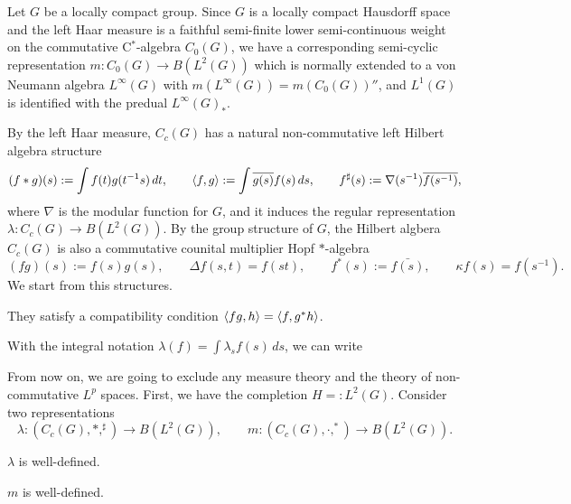 \documentclass{../../large}
\begin{document}
\begin{prb}
Let $G$ be a locally compact group.
Since $G$ is a locally compact Hausdorff space and the left Haar measure is a faithful semi-finite lower semi-continuous weight on the commutative C$^*$-algebra $C_0(G)$, we have a corresponding semi-cyclic representation $m:C_0(G)\to B(L^2(G))$ which is normally extended to a von Neumann algebra $L^\infty(G)$ with $m(L^\infty(G))=m(C_0(G))''$, and $L^1(G)$ is identified with the predual $L^\infty(G)_*$.

By the left Haar measure, $C_c(G)$ has a natural non-commutative left Hilbert algebra structure
\[(f*g)(s):=\int f(t)g(t^{-1}s)\,dt,\qquad\langle f,g\rangle:=\int\overline{g(s)}f(s)\,ds,\qquad f^\sharp(s):=\nabla(s^{-1})\overline{f(s^{-1})},\]
where $\nabla$ is the modular function for $G$, and it induces the regular representation $\lambda:C_c(G)\to B(L^2(G))$.
By the group structure of $G$, the Hilbert algbera $C_c(G)$ is also a commutative counital multiplier Hopf $*$-algebra 
\[(fg)(s):=f(s)g(s),\qquad\Delta f(s,t)=f(st),\qquad f^*(s):=\bar{f(s)},\qquad\kappa f(s)=f(s^{-1}).\]
We start from this structures.


They satisfy a compatibility condition $\langle fg,h\rangle=\langle f,g^*h\rangle$.

With the integral notation $\lambda(f)=\int\lambda_sf(s)\,ds$, we can write

From now on, we are going to exclude any measure theory and the theory of non-commutative $L^p$ spaces.
First, we have the completion $H=:L^2(G)$.
Consider two representations
\[\lambda:(C_c(G),*,^\sharp)\to B(L^2(G)),\qquad m:(C_c(G),\cdot,^*)\to B(L^2(G)).\]
\begin{parts}
\item $\lambda$ is well-defined.
\item $m$ is well-defined.
\end{parts}
\end{prb}
\end{document}
